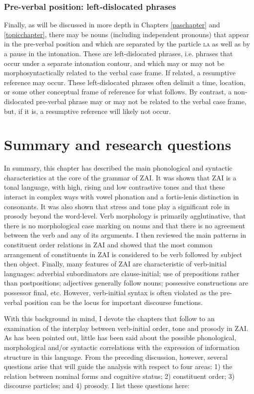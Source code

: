 \subsubsection{Pre-verbal position: left-dislocated phrases}
Finally, as will be discussed in more depth in Chapters \ref{paschapter} and \ref{topicchapter}, there may be nouns (including independent pronouns) that appear in the pre-verbal position and which are separated by the particle \textsc{la} as well as by a pause in the intonation. These are left-dislocated phrases, i.e. phrases that occur under a separate intonation contour, and which may or may not be morphosyntactically related to the verbal case frame. If related, a resumptive reference may occur. These left-dislocated phrases often delimit a time, location, or some other conceptual frame of reference for what follows. By contrast, a non-dislocated pre-verbal phrase may or may not be related to the verbal case frame, but, if it is, a resumptive reference will likely not occur. 


\section{Summary and research questions}

In summary, this chapter has described the main phonological and syntactic characteristics at the core of the grammar of ZAI. It was shown that ZAI is a tonal language, with high, rising and low contrastive tones and that these interact in complex ways with vowel phonation and a fortis-lenis distinction in consonants. It was also shown that stress and tone play a significant role in prosody beyond the word-level. Verb morphology is primarily agglutinative, that there is no morphological case marking on nouns and that there is no agreement between the verb and any of its arguments. I then reviewed the main patterns in constituent order relations in ZAI and showed that the most common arrangement of constituents in ZAI is considered to be verb followed by subject then object. Finally, many features of ZAI are characteristic of verb-initial languages: adverbial subordinators are clause-initial; use of prepositions rather than postpositions; adjectives generally follow nouns; possessive constructions are possessor final, etc. However, verb-initial syntax is often violated as the pre-verbal position can be the locus for important discourse functions.

With this background in mind, I devote the chapters that follow to an examination of the interplay between verb-initial order, tone and prosody in ZAI. As has been pointed out, little has been said about the possible phonological, morphological and/or syntactic correlations with the expression of information structure in this language. From the preceding discussion, however, several questions arise that will guide the analysis with respect to four areas: 1) the relation between nominal forms and cognitive status; 2) constituent order; 3) discourse particles; and 4) prosody. I list these questions here: 

